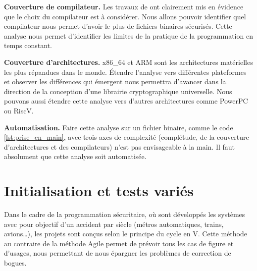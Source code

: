 \textbf{Couverture de compilateur.} Les travaux de \citeauthor{schneider2024breakingbadcompilersbreak} \cite{schneider2024breakingbadcompilersbreak} ont clairement mis en évidence que le choix du compilateur est à considérer. Nous allons pouvoir identifier quel compilateur nous permet d'avoir le plus de fichiers binaires sécurisés. Cette analyse nous permet d'identifier les limites de la pratique de la programmation en temps constant.

\textbf{Couverture d'architectures.} x86\_64 et ARM sont les architectures matérielles les plus répandues dans le monde. Étendre l'analyse vers différentes plateformes et observer les différences qui émergent nous permettra d'avancer dans la direction de la conception d'une librairie cryptographique universelle. Nous pouvons aussi étendre cette analyse vers d'autres architectures comme PowerPC ou RiscV.\medbreak


\textbf{Automatisation.} Faire cette analyse sur un fichier binaire, comme le code \ref{lst:prise_en_main}, avec trois axes de complexité (complétude, de la couverture d'architectures et des compilateurs) n'est pas envisageable à la main. Il faut absolument que cette analyse soit automatisée.


\section{Initialisation et tests variés}

Dans le cadre de la programmation sécuritaire, où sont développés les systèmes avec pour objectif d'un accident par siècle (métros automatiques, trains, avions\dots), les projets sont conçus selon le principe du cycle en V. Cette méthode au contraire de la méthode Agile permet de prévoir tous les cas de figure et d'usages, nous permettant de nous épargner les problèmes de correction de bogues.

